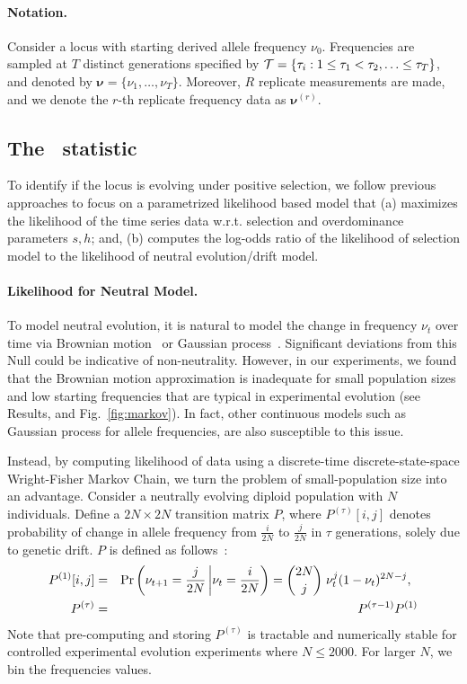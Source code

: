 \documentclass[11pt]{article}
\def\comale{\text{{\sc Comale}}}
\begin{document}
\paragraph{Notation.} 
Consider a locus with starting derived allele frequency
$\nu_0$. Frequencies are sampled at $T$ distinct generations specified
by ${\cal T}= \{\tau_i: 1\le \tau_1<\tau_2,\ldots\le \tau_T\}$, and
denoted by $\bm{\nu}=\{\nu_1,\ldots,\nu_T\}$. Moreover, $R$ replicate
measurements are made, and we denote the $r$-th replicate frequency
data as $\bm{\nu}^{(r)}$.

\subsection{The \comale\  statistic}
To identify if the locus is evolving under positive selection, we
follow previous approaches to focus on a parametrized likelihood based
model that (a) maximizes the likelihood of the time series data
w.r.t. selection and overdominance parameters $s,h$; and, (b) computes
the log-odds ratio of the likelihood of selection model to the
likelihood of neutral evolution/drift model.

\paragraph{Likelihood for Neutral Model.}
To model neutral evolution, it is natural to model the change in
frequency $\nu_t$ over time via Brownian
motion~\cite{feder2014Identifying} or Gaussian
process~\cite{Terhorst2015Multi}. Significant deviations from this
Null could be indicative of non-neutrality. However, in our
experiments, we found that the Brownian motion approximation is
inadequate for small population sizes and low starting frequencies
that are typical in experimental evolution (see Results, and
Fig.~\ref{fig:markov}). In fact, other continuous models such as
Gaussian process for allele frequencies, are also susceptible to this
issue.

Instead, by computing likelihood of data using a discrete-time
discrete-state-space Wright-Fisher Markov Chain, we turn the problem
of small-population size into an advantage. Consider a neutrally
evolving diploid population with $N$ individuals. Define a
$2N\times2N$ transition matrix $P$, where $P^{(\tau)}[i,j]$ denotes
probability of change in allele frequency from $\frac{i}{2N}$ to
$\frac{j}{2N}$ in $\tau$ generations, solely due to genetic drift. $P$
is defined as follows~\cite{Ewens2012Mathematical}:
\begin{eqnarray}
  P^{(1)}[i,j] &=& \operatorname{Pr}\left(\nu_{t+1}=\frac{j}{2N} \left|
      \nu_{t}=\frac{i}{2N}\right)={2N \choose j} \right.  \nu_{t}^j
  (1-\nu_{t})^{2N-j}, \;\;\label{eq:P1}\\
  P^{(\tau)} &=&   P^{(\tau-1)}P^{(1)} \label{eq:Pt}
\end{eqnarray}
Note that pre-computing and storing $P^{(\tau)}$ is tractable and
numerically stable for controlled experimental evolution experiments
where $N\le2000$. For larger $N$, we bin the frequencies values.
\end{document}
